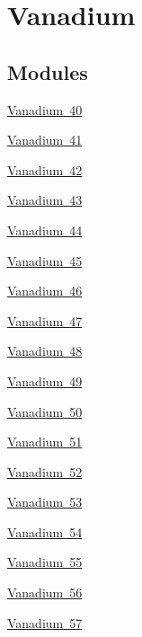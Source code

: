 \hypertarget{group___isotope_const-_vanadium}{}\section{Vanadium}
\label{group___isotope_const-_vanadium}
\subsection*{Modules}
\begin{DoxyCompactItemize}
\item 
\mbox{\hyperlink{group___isotope_const-_vanadium-_v40}{Vanadium 40}}
\item 
\mbox{\hyperlink{group___isotope_const-_vanadium-_v41}{Vanadium 41}}
\item 
\mbox{\hyperlink{group___isotope_const-_vanadium-_v42}{Vanadium 42}}
\item 
\mbox{\hyperlink{group___isotope_const-_vanadium-_v43}{Vanadium 43}}
\item 
\mbox{\hyperlink{group___isotope_const-_vanadium-_v44}{Vanadium 44}}
\item 
\mbox{\hyperlink{group___isotope_const-_vanadium-_v45}{Vanadium 45}}
\item 
\mbox{\hyperlink{group___isotope_const-_vanadium-_v46}{Vanadium 46}}
\item 
\mbox{\hyperlink{group___isotope_const-_vanadium-_v47}{Vanadium 47}}
\item 
\mbox{\hyperlink{group___isotope_const-_vanadium-_v48}{Vanadium 48}}
\item 
\mbox{\hyperlink{group___isotope_const-_vanadium-_v49}{Vanadium 49}}
\item 
\mbox{\hyperlink{group___isotope_const-_vanadium-_v50}{Vanadium 50}}
\item 
\mbox{\hyperlink{group___isotope_const-_vanadium-_v51}{Vanadium 51}}
\item 
\mbox{\hyperlink{group___isotope_const-_vanadium-_v52}{Vanadium 52}}
\item 
\mbox{\hyperlink{group___isotope_const-_vanadium-_v53}{Vanadium 53}}
\item 
\mbox{\hyperlink{group___isotope_const-_vanadium-_v54}{Vanadium 54}}
\item 
\mbox{\hyperlink{group___isotope_const-_vanadium-_v55}{Vanadium 55}}
\item 
\mbox{\hyperlink{group___isotope_const-_vanadium-_v56}{Vanadium 56}}
\item 
\mbox{\hyperlink{group___isotope_const-_vanadium-_v57}{Vanadium 57}}

\end{DoxyCompactItemize}
